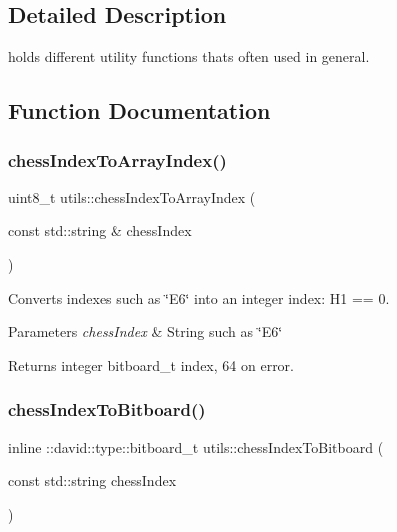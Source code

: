 \subsection{Detailed Description}
holds different utility functions that\textquotesingle{}s often used in general. 

\subsection{Function Documentation}
\mbox{\label{namespaceutils_a0a337e3860a76bb2f128b59445f0f270}} 
\subsubsection{\texorpdfstring{chess\+Index\+To\+Array\+Index()}{chessIndexToArrayIndex()}}
{\footnotesize\ttfamily uint8\+\_\+t utils\+::chess\+Index\+To\+Array\+Index (\begin{DoxyParamCaption}\item[{const std\+::string \&}]{chess\+Index }\end{DoxyParamCaption})}

Converts indexes such as \char`\"{}\+E6\char`\"{} into an integer index\+: H1 == 0.


\begin{DoxyParams}{Parameters}
{\em chess\+Index} & String such as \char`\"{}\+E6\char`\"{} \\
\hline
\end{DoxyParams}
\begin{DoxyReturn}{Returns}
integer bitboard\+\_\+t index, 64 on error. 
\end{DoxyReturn}
\mbox{\label{namespaceutils_a0636557b5feb605e766d4d475bf2aa06}} 
\subsubsection{\texorpdfstring{chess\+Index\+To\+Bitboard()}{chessIndexToBitboard()}}
{\footnotesize\ttfamily inline \+::david\+::type\+::bitboard\+\_\+t utils\+::chess\+Index\+To\+Bitboard (\begin{DoxyParamCaption}\item[{const std\+::string}]{chess\+Index }\end{DoxyParamCaption})}

